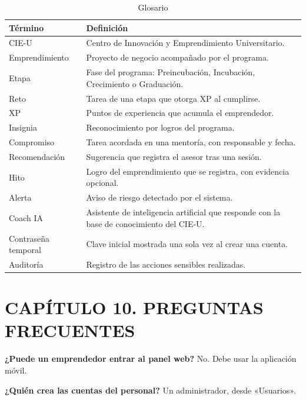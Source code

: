 \documentclass[12pt,letterpaper]{article}
\begin{document}
\begin{table}[H]\singlespacing\small
\caption{Glosario}
\begin{tabularx}{\textwidth}{XX}
\toprule
\textbf{Término} & \textbf{Definición} \\
\midrule
\relax CIE-U & Centro de Innovación y Emprendimiento Universitario. \\
\relax Emprendimiento & Proyecto de negocio acompañado por el programa. \\
\relax Etapa & Fase del programa: Preincubación, Incubación, Crecimiento o Graduación. \\
\relax Reto & Tarea de una etapa que otorga XP al cumplirse. \\
\relax XP & Puntos de experiencia que acumula el emprendedor. \\
\relax Insignia & Reconocimiento por logros del programa. \\
\relax Compromiso & Tarea acordada en una mentoría, con responsable y fecha. \\
\relax Recomendación & Sugerencia que registra el asesor tras una sesión. \\
\relax Hito & Logro del emprendimiento que se registra, con evidencia opcional. \\
\relax Alerta & Aviso de riesgo detectado por el sistema. \\
\relax Coach IA & Asistente de inteligencia artificial que responde con la base de conocimiento del CIE-U. \\
\relax Contraseña temporal & Clave inicial mostrada una sola vez al crear una cuenta. \\
\relax Auditoría & Registro de las acciones sensibles realizadas. \\
\bottomrule
\end{tabularx}
\end{table}

\clearpage

\section*{CAPÍTULO 10. PREGUNTAS FRECUENTES}


\textbf{¿Puede un emprendedor entrar al panel web?} No. Debe usar la aplicación móvil.

\textbf{¿Quién crea las cuentas del personal?} Un administrador, desde «Usuarios».
\end{document}
